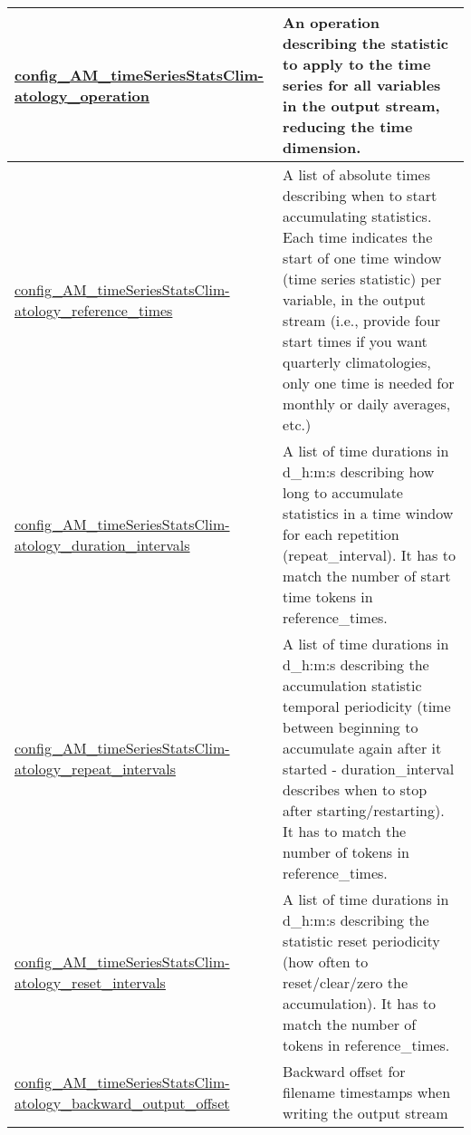 {\begin{center}
\begin{longtable}{| p{2.0in} || p{4.0in} |}
    \hline
    \hyperref[subsec:nm_sec_config_AM_timeSeriesStatsClimatology_operation]{config\_AM\_timeSeriesStatsClim-}\hyperref[subsec:nm_sec_config_AM_timeSeriesStatsClimatology_operation]{atology\_operation}& An operation describing the statistic to apply to the time series for all variables in the output stream, reducing the time dimension. \\
    \hline
    \hyperref[subsec:nm_sec_config_AM_timeSeriesStatsClimatology_reference_times]{config\_AM\_timeSeriesStatsClim-}\hyperref[subsec:nm_sec_config_AM_timeSeriesStatsClimatology_reference_times]{atology\_reference\_times}& A list of absolute times describing when to start accumulating statistics. Each time indicates the start of one time window (time series statistic) per variable, in the output stream (i.e., provide four start times if you want quarterly climatologies, only one time is needed for monthly or daily averages, etc.) \\
    \hline
    \hyperref[subsec:nm_sec_config_AM_timeSeriesStatsClimatology_duration_intervals]{config\_AM\_timeSeriesStatsClim-}\hyperref[subsec:nm_sec_config_AM_timeSeriesStatsClimatology_duration_intervals]{atology\_duration\_intervals}& A list of time durations in d\_h:m:s describing how long to accumulate statistics in a time window for each repetition (repeat\_interval). It has to match the number of start time tokens in reference\_times. \\
    \hline
    \hyperref[subsec:nm_sec_config_AM_timeSeriesStatsClimatology_repeat_intervals]{config\_AM\_timeSeriesStatsClim-}\hyperref[subsec:nm_sec_config_AM_timeSeriesStatsClimatology_repeat_intervals]{atology\_repeat\_intervals}& A list of time durations in d\_h:m:s describing the accumulation statistic temporal periodicity (time between beginning to accumulate again after it started - duration\_interval describes when to stop after starting/restarting). It has to match the number of tokens in reference\_times. \\
    \hline
    \hyperref[subsec:nm_sec_config_AM_timeSeriesStatsClimatology_reset_intervals]{config\_AM\_timeSeriesStatsClim-}\hyperref[subsec:nm_sec_config_AM_timeSeriesStatsClimatology_reset_intervals]{atology\_reset\_intervals}& A list of time durations in d\_h:m:s describing the statistic reset periodicity (how often to reset/clear/zero the accumulation). It has to match the number of tokens in reference\_times. \\
    \hline
    \hyperref[subsec:nm_sec_config_AM_timeSeriesStatsClimatology_backward_output_offset]{config\_AM\_timeSeriesStatsClim-}\hyperref[subsec:nm_sec_config_AM_timeSeriesStatsClimatology_backward_output_offset]{atology\_backward\_output\_offset}& Backward offset for filename timestamps when writing the output stream \\
    \hline
\end{longtable}
\end{center}
}
